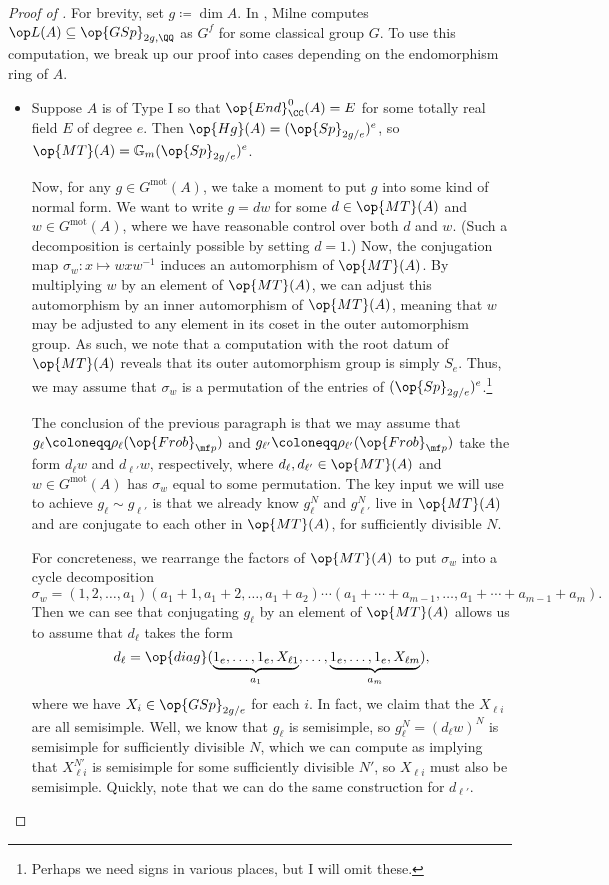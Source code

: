 \documentclass{article}
\begin{document}
\begin{proof}[Proof of ]
	For brevity, set $g\coloneqq\dim A$. In \cite[Section~2]{milne-lefschetz-group}, Milne computes $\op L(A)\subseteq\op{GSp}_{2g,\QQ}$ as $G^f$ for some classical group $G$. To use this computation, we break up our proof into cases depending on the endomorphism ring of $A$.
	\begin{itemize}
		\item Suppose $A$ is of Type I so that $\op{End}_\CC^0(A)=E$ for some totally real field $E$ of degree $e$. Then $\op{Hg}(A)=({\op{Sp}_{2g/e}})^e$, so $\op{MT}(A)=\mathbb G_m({\op{Sp}_{2g/e}})^e$.

		Now, for any $g\in G^{\mathrm{mot}}(A)$, we take a moment to put $g$ into some kind of normal form. We want to write $g=dw$ for some $d\in\op{MT}(A)$ and $w\in G^{\mathrm{mot}}(A)$, where we have reasonable control over both $d$ and $w$. (Such a decomposition is certainly possible by setting $d=1$.) Now, the conjugation map $\sigma_w\colon x\mapsto wxw^{-1}$ induces an automorphism of $\op{MT}(A)$. By multiplying $w$ by an element of $\op{MT}(A)$, we can adjust this automorphism by an inner automorphism of $\op{MT}(A)$, meaning that $w$ may be adjusted to any element in its coset in the outer automorphism group. As such, we note that a computation with the root datum of $\op{MT}(A)$ reveals that its outer automorphism group is simply $S_e$. Thus, we may assume that $\sigma_w$ is a permutation of the entries of $(\op{Sp}_{2g/e})^e$.\footnote{Perhaps we need signs in various places, but I will omit these.}

		The conclusion of the previous paragraph is that we may assume that $g_\ell\coloneqq\rho_\ell({\op{Frob}_{\mf p}})$ and $g_{\ell'}\coloneqq\rho_{\ell'}({\op{Frob}_{\mf p}})$ take the form $d_\ell w$ and $d_{\ell'}w$, respectively, where $d_\ell,d_{\ell'}\in\op{MT}(A)$ and $w\in G^{\mathrm{mot}}(A)$ has $\sigma_w$ equal to some permutation. The key input we will use to achieve $g_\ell\sim g_{\ell'}$ is that we already know $g_\ell^N$ and $g_{\ell'}^N$ live in $\op{MT}(A)$ and are conjugate to each other in $\op{MT}(A)$, for sufficiently divisible $N$.
		
		For concreteness, we rearrange the factors of $\op{MT}(A)$ to put $\sigma_w$ into a cycle decomposition
		\[\sigma_w=(1,2,\ldots,a_1)(a_1+1,a_1+2,\ldots,a_1+a_2)\cdots(a_1+\cdots+a_{m-1},\ldots,a_1+\cdots+a_{m-1}+a_m).\]
		Then we can see that conjugating $g_\ell$ by an element of $\op{MT}(A)$ allows us to assume that $d_\ell$ takes the form
		\[d_\ell=\op{diag}(\underbrace{1_e,\ldots,1_e,X_{\ell1}}_{a_1},\ldots,\underbrace{1_e,\ldots,1_e,X_{\ell m}}_{a_m}),\]
		where we have $X_i\in\op{GSp}_{2g/e}$ for each $i$. In fact, we claim that the $X_{\ell i}$ are all semisimple. Well, we know that $g_\ell$ is semisimple, so $g_\ell^N=(d_\ell w)^N$ is semisimple for sufficiently divisible $N$, which we can compute as implying that $X_{\ell i}^{N'}$ is semisimple for some sufficiently divisible $N'$, so $X_{\ell i}$ must also be semisimple. Quickly, note that we can do the same construction for $d_{\ell'}$.
		

\end{itemize}
\end{proof}
\end{document}
